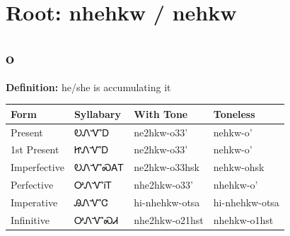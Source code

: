 \documentclass{article}%
\begin{document}
%
\normalsize%
\section*{Root: nhehkw / nehkw}%
\subsection*{o}%
\textbf{Definition: }%
he/she is accumulating it%
\\[0.5em]%
\begin{tabular}{|l|l|l|l|}%
\hline%
\textbf{Form}&\textbf{Syllabary}&\textbf{With Tone}&\textbf{Toneless}\\%
\hline%
Present&ᎧᏁᏉᎠ&ne2hkw{-}o33'&nehkw{-}o'\\%
1st Present&ᏥᏁᏉᎠ&ne2hkw{-}o33'&nehkw{-}o'\\%
Imperfective&ᎧᏁᏉᏍᎪᎢ&ne2hkw{-}o33hsk&nehkw{-}ohsk\\%
Perfective&ᎤᏁᏉᎥᎢ&nhe2hkw{-}o33'&nhehkw{-}o'\\%
Imperative&ᎯᏁᏉᏣ&hi{-}nhehkw{-}otsa&hi{-}nhehkw{-}otsa\\%
Infinitive&ᎤᏁᏉᏍᏗ&nhe2hkw{-}o21hst&nhehkw{-}o1hst\\%
\hline%
\end{tabular}%
\\[1em]%
\end{document}
